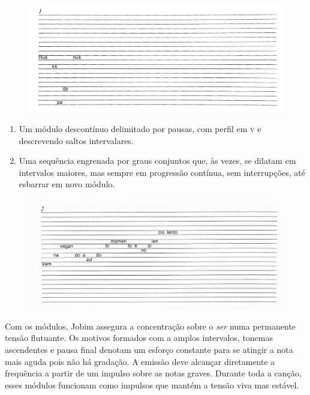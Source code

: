 \begin{figure}[H]
\includegraphics[width=\textwidth]{./imgs/figura22.jpg}
\end{figure}

\begin{enumerate}
\item Um módulo descontínuo delimitado por
pausas, com perfil em \textsc{v} e descrevendo saltos intervalares.

\item Uma sequência engrenada por graus conjuntos que, às vezes, se
dilatam em intervalos maiores, mas sempre em progressão contínua, sem
interrupções, até esbarrar em novo módulo.
\end{enumerate}

\begin{figure}[H]
\includegraphics[width=\textwidth]{./imgs/figura23.jpg}
\end{figure}

Com os módulos, Jobim assegura a concentração sobre o \textit{ser} numa
permanente tensão flutuante. Os motivos formados com a amplos
intervalos, tonemas ascendentes e pausa final denotam um esforço
constante para se atingir a nota mais aguda pois não há gradação. A
emissão deve alcançar diretamente a frequência a partir de um impulso
sobre as notas graves. Durante toda a canção, esses módulos funcionam
como impulsos que mantém a tensão viva mas estável.

